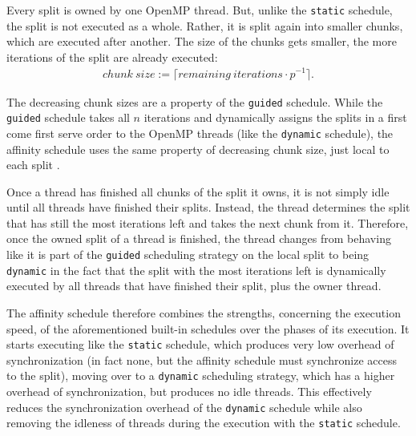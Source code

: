 \documentclass[twoside,11pt]{article}
\begin{document}
Every split is owned by one OpenMP thread. But, unlike the
\texttt{static} schedule, the split is not executed as a
whole.
Rather, it is split again into smaller chunks, which are
executed after another.
The size of the chunks gets smaller, the more iterations
of the split are already executed:
\begin{align*}
  chunk\ size := \lceil remaining\ iterations \cdot p^{-1} \rceil.
\end{align*}

The decreasing chunk sizes are a property of the
\texttt{guided} schedule.
While the \texttt{guided} schedule takes all $n$ iterations
and dynamically assigns the splits in a first come first
serve order to the OpenMP threads (like the
\texttt{dynamic} schedule), the affinity schedule
uses the same property of decreasing chunk size, just local
to each split \citep[see][Chapter 2]{omp}.

Once a thread has finished all chunks of the split it owns,
it is not simply idle until all threads have finished their
splits.
Instead, the thread determines the split that has still the
most iterations left and takes the next chunk from it.
Therefore, once the owned split of a thread is finished,
the thread changes from behaving like it is part of the
\texttt{guided} scheduling strategy on the local split to
being \texttt{dynamic} in the fact that the split with the
most iterations left is dynamically executed by all threads
that have finished their split, plus the owner thread.

The affinity schedule therefore combines the strengths,
concerning the execution speed, of the aforementioned
built-in schedules over the phases of its execution.
It starts executing like the \texttt{static} schedule,
which produces very low overhead of synchronization (in
fact none, but the affinity schedule must synchronize
access to the split), moving over to a \texttt{dynamic}
scheduling strategy,
which has a higher overhead of synchronization, but
produces no idle threads.
This effectively reduces the synchronization overhead of
the \texttt{dynamic} schedule while also removing the
idleness of threads during the execution with the
\texttt{static} schedule.
\end{document}
